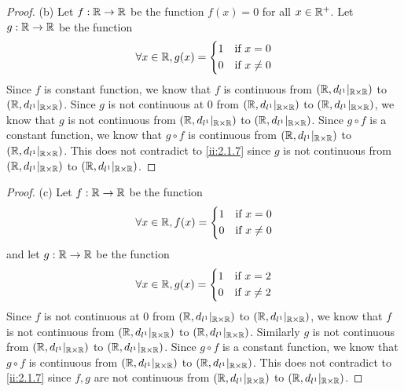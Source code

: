 \begin{proof}{(b)}
  Let \(f : \mathbb{R} \to \mathbb{R}\) be the function \(f(x) = 0\) for all \(x \in \mathbb{R}^+\).
  Let \(g : \mathbb{R} \to \mathbb{R}\) be the function
  \[
    \forall x \in \mathbb{R}, g(x) = \begin{dcases}
      1 & \text{if } x = 0    \\
      0 & \text{if } x \neq 0
    \end{dcases}
  \]
  Since \(f\) is constant function, we know that \(f\) is continuous from \((\mathbb{R}, d_{l^1}|_{\mathbb{R} \times \mathbb{R}})\) to \((\mathbb{R}, d_{l^1}|_{\mathbb{R} \times \mathbb{R}})\).
  Since \(g\) is not continuous at \(0\) from \((\mathbb{R}, d_{l^1}|_{\mathbb{R} \times \mathbb{R}})\) to \((\mathbb{R}, d_{l^1}|_{\mathbb{R} \times \mathbb{R}})\), we know that \(g\) is not continuous from \((\mathbb{R}, d_{l^1}|_{\mathbb{R} \times \mathbb{R}})\) to \((\mathbb{R}, d_{l^1}|_{\mathbb{R} \times \mathbb{R}})\).
  Since \(g \circ f\) is a constant function, we know that \(g \circ f\) is continuous from \((\mathbb{R}, d_{l^1}|_{\mathbb{R} \times \mathbb{R}})\) to \((\mathbb{R}, d_{l^1}|_{\mathbb{R} \times \mathbb{R}})\).
  This does not contradict to \cref{ii:2.1.7} since \(g\) is not continuous from \((\mathbb{R}, d_{l^1}|_{\mathbb{R} \times \mathbb{R}})\) to \((\mathbb{R}, d_{l^1}|_{\mathbb{R} \times \mathbb{R}})\).
\end{proof}

\begin{proof}{(c)}
  Let \(f : \mathbb{R} \to \mathbb{R}\) be the function
  \[
    \forall x \in \mathbb{R}, f(x) = \begin{dcases}
      1 & \text{if } x = 0    \\
      0 & \text{if } x \neq 0
    \end{dcases}
  \]
  and let \(g : \mathbb{R} \to \mathbb{R}\) be the function
  \[
    \forall x \in \mathbb{R}, g(x) = \begin{dcases}
      1 & \text{if } x = 2    \\
      0 & \text{if } x \neq 2
    \end{dcases}
  \]
  Since \(f\) is not continuous at \(0\) from \((\mathbb{R}, d_{l^1}|_{\mathbb{R} \times \mathbb{R}})\) to \((\mathbb{R}, d_{l^1}|_{\mathbb{R} \times \mathbb{R}})\), we know that \(f\) is not continuous from \((\mathbb{R}, d_{l^1}|_{\mathbb{R} \times \mathbb{R}})\) to \((\mathbb{R}, d_{l^1}|_{\mathbb{R} \times \mathbb{R}})\).
  Similarly \(g\) is not continuous from \((\mathbb{R}, d_{l^1}|_{\mathbb{R} \times \mathbb{R}})\) to \((\mathbb{R}, d_{l^1}|_{\mathbb{R} \times \mathbb{R}})\).
  Since \(g \circ f\) is a constant function, we know that \(g \circ f\) is continuous from \((\mathbb{R}, d_{l^1}|_{\mathbb{R} \times \mathbb{R}})\) to \((\mathbb{R}, d_{l^1}|_{\mathbb{R} \times \mathbb{R}})\).
  This does not contradict to \cref{ii:2.1.7} since \(f, g\) are not continuous from \((\mathbb{R}, d_{l^1}|_{\mathbb{R} \times \mathbb{R}})\) to \((\mathbb{R}, d_{l^1}|_{\mathbb{R} \times \mathbb{R}})\).
\end{proof}

